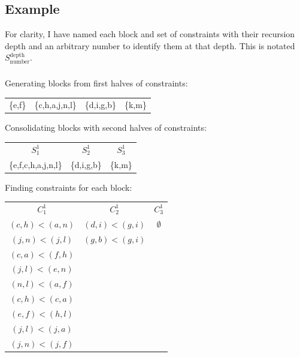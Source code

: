 \documentclass[11pt]{article} %
\begin{document}
\subsection{Example}
For clarity, I have named each block and set of constraints with their recursion depth and an arbitrary number to identify them at that depth. This is notated $S_\text{number}^\text{depth}$.

\setcounter{subsubsection}{-1}

\subsubsection{}
	\begin{center}
	Generating blocks from first halves of constraints:
	
	\begin{tabular}{c c c c}
		\{e,f\} & \{c,h,a,j,n,l\} & \{d,i,g,b\} & \{k,m\}
	\end{tabular}
	
	Consolidating blocks with second halves of constraints:
	
	\begin{tabular}{c c c}
		\hspace{0.8cm}$S_1^1$\hspace{0.8cm} & \hspace{0.8cm}$S_2^1$\hspace{0.8cm} & \hspace{0.8cm}$S_3^1$\hspace{0.8cm} \\
		\{e,f,c,h,a,j,n,l\} & \{d,i,g,b\} & \{k,m\}
	\end{tabular}
	
	Finding constraints for each block:
	
	\begin{tabular}{c c c}
		\hspace{0.8cm}$C_1^1$\hspace{0.8cm} & \hspace{0.8cm}$C_2^1$\hspace{0.8cm} & \hspace{0.8cm}$C_3^1$\hspace{0.8cm} \\
		$(c,h)<(a,n)$ & $(d,i)<(g,i)$ & $\emptyset$ \\
		$(j,n)<(j,l)$ & $(g,b)<(g,i)$ \\
		$(c,a)<(f,h)$ \\
		$(j,l)<(e,n)$ \\
		$(n,l)<(a,f)$ \\
		$(c,h)<(c,a)$ \\
		$(e,f)<(h,l)$ \\
		$(j,l)<(j,a)$ \\
		$(j,n)<(j,f)$ \\
	\end{tabular}


\end{center}
\end{document}
